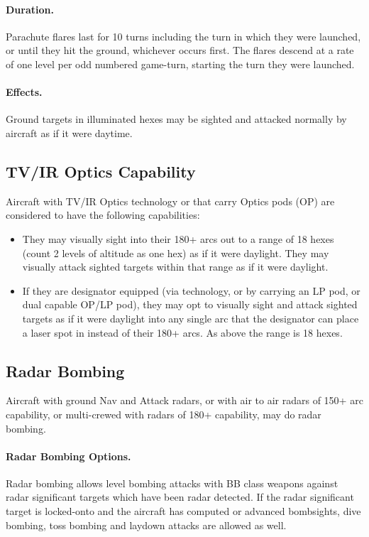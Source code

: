 \begin{advancedrules}
\paragraph{Duration.} Parachute flares last for 10 turns including the turn in which they were launched, or until they hit the ground, whichever occurs first. The flares descend at a rate of one level per odd numbered game-turn, starting the turn they were launched.

\paragraph{Effects.} Ground targets in illuminated hexes may be sighted and attacked normally by aircraft as if it were daytime.

\subsection{TV/IR Optics Capability}

Aircraft with TV/IR Optics technology or that carry Optics pods (OP) are considered to have the following capabilities:

\begin{itemize}

    \item They may visually sight into their 180+ arcs out to a range of 18 hexes (count 2 levels of altitude as one hex) as if it were daylight. They may visually attack sighted targets within that range as if it were daylight.

    \item If they are designator equipped (via technology, or by carrying an LP pod, or dual capable OP/LP pod), they may opt to visually sight and attack sighted targets as if it were daylight into any single arc that the designator can place a laser spot in instead of their 180+ arcs. As above the range is 18 hexes.

\end{itemize}

\subsection{Radar Bombing}

Aircraft with ground Nav and Attack radars, or with air to air radars of 150+ arc capability, or multi-crewed with radars of 180+ capability, may do radar bombing.

\paragraph{Radar Bombing Options.} Radar bombing allows level bombing attacks with BB class weapons against radar significant targets which have been radar detected. If the radar significant target is locked-onto and the aircraft has computed or advanced bombsights, dive bombing, toss bombing and laydown attacks are allowed as well.


\end{advancedrules}
